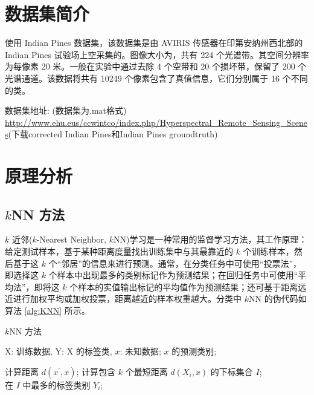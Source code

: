 \documentclass[12pt,AutoFakeBold]{article}
\begin{document}
\maketitle
\setcounter{tocdepth}{2}

\tableofcontents  %

\makeatletter
\begin{center}
    \LARGE \textbf{\textsf{\@problem}}
\end{center}
\makeatother


\section{数据集简介}

使用 Indian Pines 数据集，该数据集是由 AVIRIS 传感器在印第安纳州西北部的 Indian Pines 试验场上空采集的。图像大小为，共有 224 个光谱带。其空间分辨率为每像素 20 米。一般在实验中通过去除 4 个空带和 20 个损坏带，保留了 200 个光谱通道。该数据将共有 10249 个像素包含了真值信息，它们分别属于 16 个不同的类。

数据集地址: (数据集为.mat格式) \url{http://www.ehu.eus/ccwintco/index.php/Hyperspectral_Remote_Sensing_Scenes}(下载corrected Indian Pines和Indian Pines groundtruth)

\section{原理分析}

\subsection{$k$NN 方法}

$k$ 近邻($k$-Nearest Neighbor, $k$NN)学习是一种常用的监督学习方法，其工作原理：给定测试样本，基于某种距离度量找出训练集中与其最靠近的 $k$ 个训练样本，然后基于这 $k$ 个“邻居”的信息来进行预测。通常，在分类任务中可使用“投票法”，即选择这 $k$ 个样本中出现最多的类别标记作为预测结果；在回归任务中可使用“平均法”，即将这 $k$ 个样本的实值输出标记的平均值作为预测结果；还可基于距离远近进行加权平均或加权投票，距离越近的样本权重越大。分类中 $k$NN 的伪代码如算法 \ref{alg:KNN} 所示。

\begin{algorithm}[hbtp]
	\caption{$k$NN 方法}
	\label{alg:KNN}
	\begin{algorithmic}[1]
	\Require $\mathrm{X}$: 训练数据, $\mathrm{Y}$: $\mathrm{X}$ 的标签类, $x$: 未知数据;
	\Ensure $x$ 的预测类别; 
	
		\State 计算距离 $d(x^{'},x)$;
	\EndFor
	\State 计算包含 $k$ 个最短距离 $d(X_i,x)$ 的下标集合 $I$;
	\\
	\Return 在 $I$ 中最多的标签类别 $Y_i$;
	\end{algorithmic} 
\end{algorithm}
\end{document}

